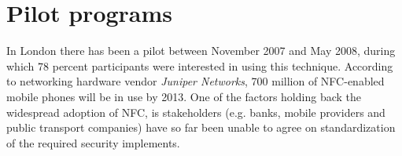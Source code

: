 

\section{Pilot programs}
In London there has been a pilot between November 2007 and May 2008, during which 78 percent participants were interested in using this technique.
According to networking hardware vendor \textit{Juniper Networks}, 700 million of NFC-enabled mobile phones will be in use by 2013. 
One of the factors holding back the widespread adoption of NFC, is stakeholders (e.g. banks, mobile providers and public transport companies) have so far been unable to agree on standardization of the required security implements. 
